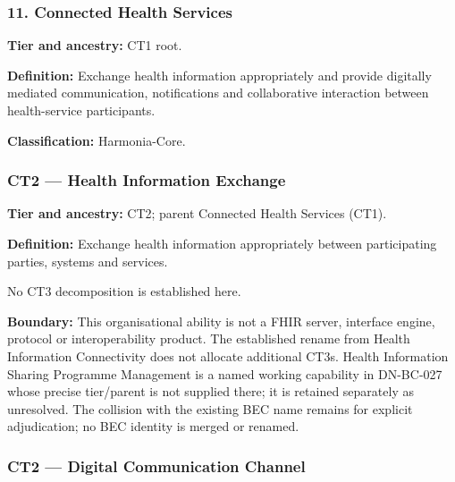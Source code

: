 \label{rad:business:730}
\subsubsection*{11. Connected Health Services}
\label{rad:business:732}

\textbf{Tier and ancestry:} CT1 root.

\label{rad:business:734}

\textbf{Definition:} Exchange health information appropriately and provide digitally mediated communication, notifications and collaborative interaction between health-service participants.

\label{rad:business:736}

\textbf{Classification:} Harmonia-Core.

\label{rad:business:738}
\subsubsection*{CT2 — Health Information Exchange}
\label{rad:business:740}

\textbf{Tier and ancestry:} CT2; parent Connected Health Services (CT1).

\label{rad:business:742}

\textbf{Definition:} Exchange health information appropriately between participating parties, systems and services.

\label{rad:business:744}

No CT3 decomposition is established here.

\label{rad:business:746}

\textbf{Boundary:} This organisational ability is not a FHIR server, interface engine, protocol or interoperability product. The established rename from Health Information Connectivity does not allocate additional CT3s. Health Information Sharing Programme Management is a named working capability in DN-BC-027 whose precise tier/\allowbreak{}parent is not supplied there; it is retained separately as unresolved. The collision with the existing BEC name remains for explicit adjudication; no BEC identity is merged or renamed.

\label{rad:business:748}
\subsubsection*{CT2 — Digital Communication Channel}
\label{rad:business:750}

